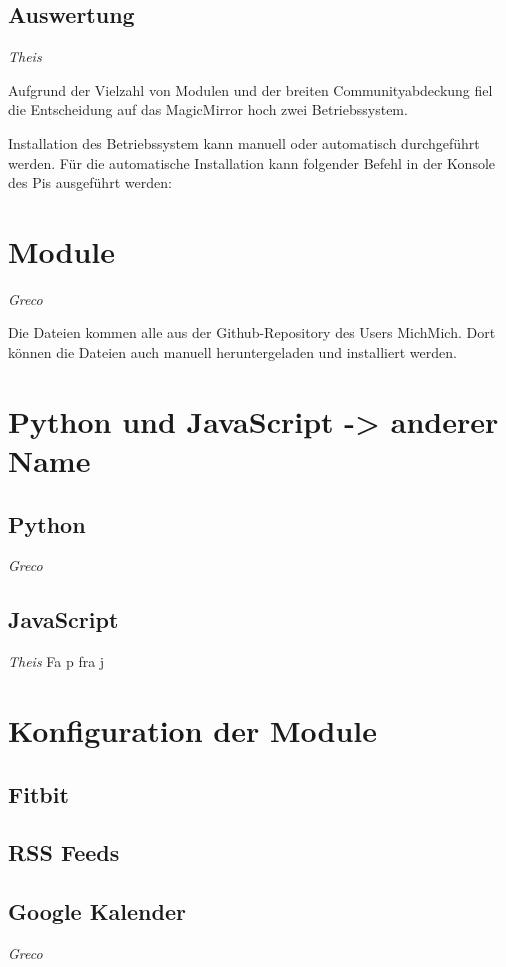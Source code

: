 \documentclass[12pt,a4paper]{report}
\begin{document}
\subsection*{Auswertung}

\textit{Theis}


Aufgrund der Vielzahl von Modulen und der breiten Communityabdeckung fiel die Entscheidung auf das MagicMirror hoch zwei Betriebssystem. 


Installation des Betriebssystem kann manuell oder automatisch durchgeführt werden. 
Für die automatische Installation kann folgender Befehl in der Konsole des Pis ausgeführt werden:


\section{Module}
\textit{Greco}


Die Dateien kommen alle aus der Github-Repository des Users MichMich. Dort können die Dateien auch manuell heruntergeladen und installiert werden. 
\section{Python und JavaScript -> anderer Name}
\subsection*{Python}
\textit{Greco}
\subsection*{JavaScript}
\textit{Theis}
Fa p fra j
\section{Konfiguration der Module}
\subsection{Fitbit}
\subsection{RSS Feeds}
\subsection{Google Kalender}
\textit{Greco}
\end{document}
